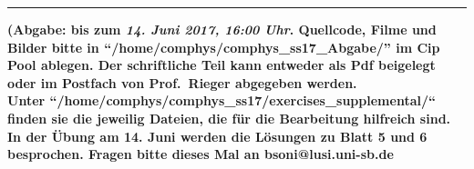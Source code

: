 \documentclass[english,10pt]{newexam}
\begin{document}
\vspace*{-0.5cm}\hrule
\begin{center} 
{\bfseries \sf(Abgabe: bis zum \textit{14. Juni 2017, 16:00 Uhr}.
Quellcode, Filme und Bilder bitte in ``/home/comphys/comphys\_ss17\_Abgabe/'' im Cip Pool ablegen.
Der schriftliche Teil kann entweder als Pdf beigelegt oder im Postfach von Prof.~Rieger abgegeben werden.
\\
Unter ``/home/comphys/comphys\_ss17/exercises\_supplemental/`` finden sie die jeweilig Dateien, die 
f\"ur die Bearbeitung hilfreich sind.
\\
In der Übung am 14. Juni werden die Lösungen zu Blatt 5 und 6 besprochen.
Fragen bitte dieses Mal an bsoni@lusi.uni-sb.de }\\[.3cm]
\end{center}
\end{document}
